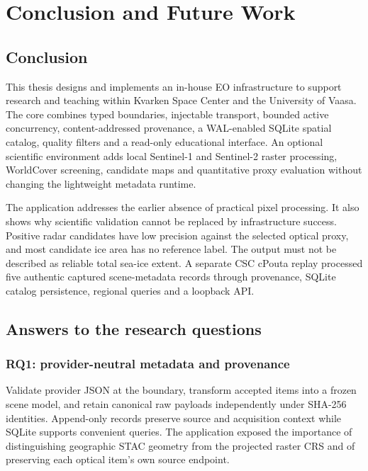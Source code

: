 \chapter{Conclusion and Future Work}

\section{Conclusion}

This thesis designs and implements an in-house EO infrastructure to support research and
teaching within Kvarken Space Center and the University of Vaasa. The core combines typed
boundaries, injectable transport, bounded active concurrency, content-addressed provenance,
a WAL-enabled SQLite spatial catalog, quality filters and a read-only educational interface.
An optional scientific environment adds local Sentinel-1 and Sentinel-2 raster processing,
WorldCover screening, candidate maps and quantitative proxy evaluation without changing the
lightweight metadata runtime.

The application addresses the earlier absence of practical pixel processing. It also
shows why scientific validation cannot be replaced by infrastructure success. Positive
radar candidates have low precision against the selected optical proxy, and most candidate
ice area has no reference label. The output must not be described as reliable total
sea-ice extent. A separate CSC cPouta replay processed five authentic captured scene-metadata records through
provenance, SQLite catalog persistence, regional queries and a loopback API.

\section{Answers to the research questions}

\subsection{RQ1: provider-neutral metadata and provenance}

Validate provider JSON at the boundary, transform accepted items into a frozen scene model,
and retain canonical raw payloads independently under SHA-256 identities. Append-only
records preserve source and acquisition context while SQLite supports convenient queries.
The application exposed the importance of distinguishing geographic STAC geometry from
the projected raster CRS and of preserving each optical item's own source endpoint.

